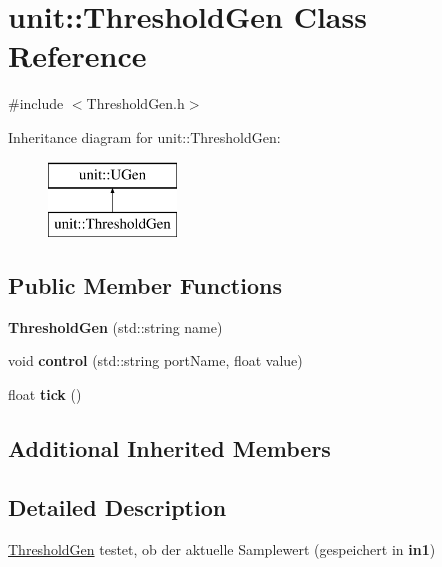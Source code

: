 \hypertarget{classunit_1_1ThresholdGen}{}\section{unit\+:\+:Threshold\+Gen Class Reference}
\label{classunit_1_1ThresholdGen}


{\ttfamily \#include $<$Threshold\+Gen.\+h$>$}

Inheritance diagram for unit\+:\+:Threshold\+Gen\+:\begin{figure}[H]
\begin{center}
\leavevmode
\includegraphics[height=2.000000cm]{classunit_1_1ThresholdGen}
\end{center}
\end{figure}
\subsection*{Public Member Functions}
\begin{DoxyCompactItemize}
\item 
{\bfseries Threshold\+Gen} (std\+::string name)\hypertarget{classunit_1_1ThresholdGen_ac4b7861be1523284fbd1158afa6da231}{}\label{classunit_1_1ThresholdGen_ac4b7861be1523284fbd1158afa6da231}

\item 
void {\bfseries control} (std\+::string port\+Name, float value)\hypertarget{classunit_1_1ThresholdGen_aafd3ea65bfc964598119efd3988068ee}{}\label{classunit_1_1ThresholdGen_aafd3ea65bfc964598119efd3988068ee}

\item 
float {\bfseries tick} ()\hypertarget{classunit_1_1ThresholdGen_a422ab3288c91db592849ca1328a6ee6b}{}\label{classunit_1_1ThresholdGen_a422ab3288c91db592849ca1328a6ee6b}

\end{DoxyCompactItemize}
\subsection*{Additional Inherited Members}


\subsection{Detailed Description}
\hyperlink{classunit_1_1ThresholdGen}{Threshold\+Gen} testet, ob der aktuelle Samplewert (gespeichert in {\bfseries in1})


